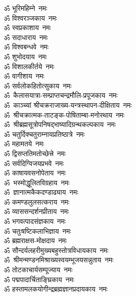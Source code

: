 \begin{multicols}{2}
\begin{flushleft}
        ॐ भूरिमहिम्ने~नमः\\
        ॐ विश्वरञ्जकाय~नमः\\
        ॐ स्वप्रकाशाय~नमः\\
        ॐ सदाधाराय~नमः\\
        ॐ विश्वबन्धवे~नमः\\
        ॐ शुभोदयाय~नमः\\
        ॐ विशालकीर्तये~नमः\\
        ॐ वागीशाय~नमः\\
        ॐ सर्वलोकहितोत्सुकाय~नमः\\
        ॐ~कैलासयात्रा-सम्प्राप्त\-चन्द्र\-मौलि-प्रपूजकाय~नमः\hfill{}\\
                                        
        ॐ~काञ्च्यां श्रीचक्रराजाख्य-यन्त्रस्थापन-दीक्षिताय~नमः\\
        ॐ~श्रीचक्रात्मक-ताटङ्क-पोषिताम्बा-मनोरथाय~नमः\\
        ॐ~श्रीब्रह्मसूत्रोपनिषद्\-भाष्यादि\-ग्रन्थ\-कल्पकाय~नमः\\
        ॐ चतुर्दिक्चतुराम्नाय\-प्रतिष्ठात्रे~नमः\\
        ॐ महामतये~नमः\\
        ॐ द्विसप्ततिमतोच्छेत्त्रे~नमः\\
        ॐ सर्वदिग्विजयप्रभवे~नमः\\
        ॐ काषायवसनोपेताय~नमः\\
        ॐ~भस्मोद्धूलितविग्रहाय~नमः\\
        ॐ~ज्ञानात्मकैकदण्डाढ्याय~नमः\hfill{}\\
        
        ॐ कमण्डलुलसत्कराय~नमः\\
        ॐ व्याससन्दर्शनप्रीताय~नमः\\
        ॐ भगवत्पादसंज्ञकाय~नमः\\
        ॐ चतुःषष्टिकलाभिज्ञाय~नमः\\
        ॐ ब्रह्मराक्षस-मोक्षदाय~नमः\\
        ॐ सौन्दर्यलहरी\-मुख्य\-बहु\-स्तोत्र\-विधाय\-काय~नमः\\
        ॐ~श्रीमन्मण्डन\-मिश्राख्य\-स्वयम्भू\-जय\-सन्नुताय~नमः\\
        ॐ तोटकाचार्यसम्पूज्याय~नमः\\
        ॐ पद्मपादार्चिताङ्घ्रिकाय~नमः\\
        ॐ हस्तामलक\-योगीन्द्र\-ब्रह्म\-ज्ञान\-प्रदायकाय~नमः\hfill{}\\


\end{flushleft}
\end{multicols}
